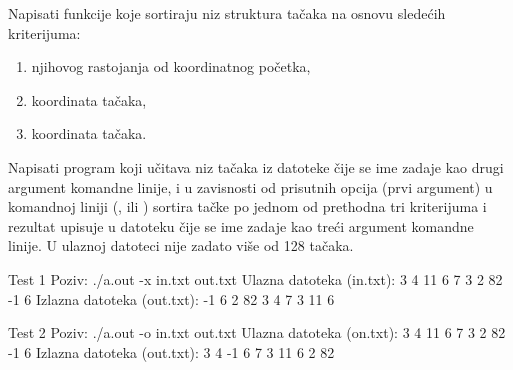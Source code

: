 \begin{Answer}[ref=507]
\end{Answer}
\begin{Exercise}[label=508]
  Napisati funkcije koje sortiraju niz struktura tačaka na
  osnovu sledećih kriterijuma:
  \begin{enumerate}
  \item njihovog rastojanja od koordinatnog početka,
  \item {} koordinata tačaka,
  \item {} koordinata tačaka.
  \end{enumerate}
  Napisati program koji učitava niz tačaka iz datoteke čije se ime
  zadaje kao drugi argument komandne linije, i u zavisnosti od
  prisutnih opcija (prvi argument) u komandnoj liniji (,
   ili ) sortira tačke po jednom od prethodna tri
  kriterijuma i rezultat upisuje u datoteku čije se ime zadaje kao
  treći argument komandne linije. U ulaznoj datoteci nije zadato više
  od 128 tačaka.
  
\begin{miditest}
\begin{test}{Test 1}
Poziv:  ./a.out -x in.txt out.txt
Ulazna datoteka (in.txt):
  3 4
  11 6
  7 3
  2 82
  -1 6
Izlazna datoteka (out.txt):
  -1 6
  2 82
  3 4
  7 3
  11 6
\end{test}
\end{miditest}
\begin{miditest}
\begin{test}{Test 2}
Poziv:  ./a.out -o in.txt out.txt
Ulazna datoteka (on.txt):
  3 4
  11 6
  7 3
  2 82
  -1 6
Izlazna datoteka (out.txt):
  3 4
  -1 6
  7 3
  11 6
  2 82
\end{test}
\end{miditest}
  
\end{Exercise}

